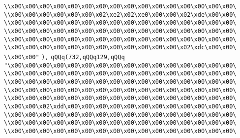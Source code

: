 \verb|\\x00\x00\x00\x00\x00\x00\x00\x00\x00\x00\x00\x00\x00\x00\x00\x00\|\newline
\verb|\\x00\x00\x00\x00\x00\x00\x02\xe2\x02\xe0\x00\x00\x02\xde\x00\x00\|\newline
\verb|\\x00\x00\x00\x00\x00\x00\x00\x00\x00\x00\x00\x00\x00\x00\x00\x00\|\newline
\verb|\\x00\x00\x00\x00\x00\x00\x00\x00\x00\x00\x00\x00\x00\x00\x00\x00\|\newline
\verb|\\x00\x00\x00\x00\x00\x00\x00\x00\x00\x00\x00\x00\x00\x00\x00\x00\|\newline
\verb|\\x00\x00\x00\x00\x00\x00\x00\x00\x00\x00\x00\x00\x02\xdc\x00\x00\|\newline
\verb|\\x00\x00"|\newline
\verb|),|\newline
\verb|qQQq(732,qQQq129,qQQq|\newline
\verb|"\x00\x00\x00\x00\x00\x00\x00\x00\x00\x00\x00\x00\x00\x00\x00\x00\|\newline
\verb|\\x00\x00\x00\x00\x00\x00\x00\x00\x00\x00\x00\x00\x00\x00\x00\x00\|\newline
\verb|\\x00\x00\x00\x00\x00\x00\x00\x00\x00\x00\x00\x00\x00\x00\x00\x00\|\newline
\verb|\\x00\x00\x00\x00\x00\x00\x00\x00\x00\x00\x00\x00\x00\x00\x00\x00\|\newline
\verb|\\x00\x00\x00\x00\x00\x00\x00\x00\x00\x00\x00\x00\x00\x00\x00\x00\|\newline
\verb|\\x00\x00\x02\xdd\x00\x00\x00\x00\x00\x00\x00\x00\x00\x00\x00\x00\|\newline
\verb|\\x00\x00\x00\x00\x00\x00\x00\x00\x00\x00\x00\x00\x00\x00\x00\x00\|\newline
\verb|\\x00\x00\x00\x00\x00\x00\x00\x00\x00\x00\x00\x00\x00\x00\x00\x00\|\newline
\verb|\\x00\x00\x00\x00\x00\x00\x00\x00\x00\x00\x00\x00\x00\x00\x00\x00\|\newline
